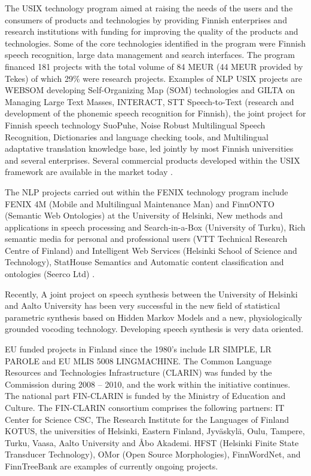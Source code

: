 \documentclass{../../metanetpaper}
\begin{document}
\begin{Parallel}[c]{79mm}{78mm}
{The USIX technology program aimed at raising the needs of the users and the
consumers of products and technologies by providing Finnish enterprises and
research institutions with funding for improving the quality of the products
and technologies. Some of the core technologies identified in the program were
Finnish speech recognition, large data management and search interfaces. The
program financed 181 projects with the total volume of 84 MEUR (44 MEUR
provided by Tekes) of which 29\% were research projects. Examples of NLP USIX
projects are WEBSOM developing Self-Organizing Map (SOM) technologies and GILTA
on Managing Large Text Masses, INTERACT, STT Speech-to-Text (research and
development of the phonemic speech recognition for Finnish), the joint project
for Finnish speech technology SuoPuhe, Noise Robust Multilingual Speech
Recognition, Dictionaries and language checking tools, and Multilingual
adaptative translation knowledge base, led jointly by most Finnish universities
and several enterprises. Several commercial products developed within the USIX
framework are available in the market today \cite{LoppuUSIX}.

The NLP projects carried out within the FENIX technology program include FENIX
4M (Mobile and Multilingual Maintenance Man) and FinnONTO (Semantic Web
Ontologies) at the University of Helsinki, New methods and applications in
speech processing and Search-in-a-Box (University of Turku), Rich semantic
media for personal and professional users (VTT Technical Research Centre of
Finland) and Intelligent Web Services (Helsinki School of Science and
Technology), StatHouse Semantics and Automatic content classification and
ontologies (Seerco Ltd) \cite{FinalFENIX}.

Recently, A joint project on speech synthesis between the University of
Helsinki and Aalto University has been very successful in the new field of
statistical parametric synthesis based on Hidden Markov Models and a new,
physiologically grounded vocoding technology. Developing speech synthesis is
very data oriented.

EU funded projects in Finland since the 1980’s include LR SIMPLE, LR
PAROLE and EU MLIS 5008 LINGMACHINE.  The Common Language Resources
and Technologies Infrastructure (CLARIN) was funded by the Commission
during 2008 – 2010, and the work within the initiative continues. The
national part FIN-CLARIN is funded by the Ministry of Education and
Culture. The FIN-CLARIN consortium comprises the following partners:
IT Center for Science CSC, The Research Institute for the Languages of
Finland KOTUS, the universities of Helsinki, Eastern Finland,
Jyväskylä, Oulu, Tampere, Turku, Vaasa, Aalto University and Åbo
Akademi. HFST (Helsinki Finite State Transducer Technology), OMor
(Open Source Morphologies), FinnWordNet, and FinnTreeBank are examples
of currently ongoing projects.

}
\end{Parallel}
\end{document}

